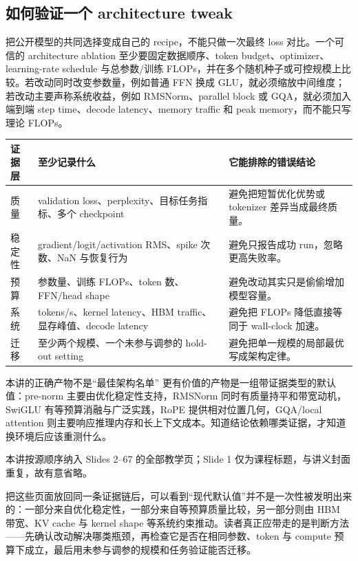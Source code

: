 \documentclass[a4paper]{article}
\begin{document}
\subsection{如何验证一个 architecture tweak}

把公开模型的共同选择变成自己的 recipe，不能只做一次最终 loss 对比。一个可信的 architecture ablation 至少要固定数据顺序、token budget、optimizer、learning-rate schedule 与总参数/训练 FLOPs，并在多个随机种子或可控规模上比较。若改动同时改变参数量，例如普通 FFN 换成 GLU，就必须缩放中间维度；若改动主要声称系统收益，例如 RMSNorm、parallel block 或 GQA，就必须加入端到端 step time、decode latency、memory traffic 和 peak memory，而不能只写理论 FLOPs。

\begin{longtable}{p{}p{}p{}}
\toprule
证据层 & 至少记录什么 & 它能排除的错误结论 \\
\midrule
质量 & validation loss、perplexity、目标任务指标、多个 checkpoint & 避免把短暂优化优势或 tokenizer 差异当成最终质量。 \\
稳定性 & gradient/logit/activation RMS、spike 次数、NaN 与恢复行为 & 避免只报告成功 run，忽略更高失败率。 \\
预算 & 参数量、训练 FLOPs、token 数、FFN/head shape & 避免改动其实只是偷偷增加模型容量。 \\
系统 & tokens/s、kernel latency、HBM traffic、显存峰值、decode latency & 避免把 FLOPs 降低直接等同于 wall-clock 加速。 \\
迁移 & 至少两个规模、一个未参与调参的 hold-out setting & 避免把单一规模的局部最优写成架构定律。 \\
\bottomrule
\end{longtable}

\begin{importantbox}{本讲的正确产物不是“最佳架构名单”}
更有价值的产物是一组带证据类型的默认值：pre-norm 主要由优化稳定性支持，RMSNorm 同时有质量持平和带宽动机，SwiGLU 有等预算消融与广泛实践，RoPE 提供相对位置几何，GQA/local attention 则主要响应推理内存和长上下文成本。知道结论依赖哪类证据，才知道换环境后应该重测什么。
\end{importantbox}

本讲按源顺序纳入 Slides 2--67 的全部教学页；Slide 1 仅为课程标题，与讲义封面重复，故有意省略。

把这些页面放回同一条证据链后，可以看到“现代默认值”并不是一次性被发明出来的：一部分来自优化稳定性，一部分来自等预算质量比较，另一部分则由 HBM 带宽、KV cache 与 kernel shape 等系统约束推动。读者真正应带走的是判断方法——先确认改动解决哪类瓶颈，再检查它是否在相同参数、token 与 compute 预算下成立，最后用未参与调参的规模和任务验证能否迁移。
\end{document}
